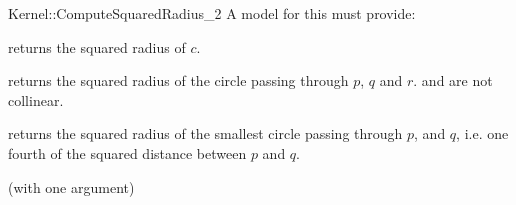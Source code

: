 \begin{ccRefFunctionObjectConcept}{Kernel::ComputeSquaredRadius_2}
A model for this must provide:


       {returns the squared radius of $c$. }

       {returns the squared radius of the circle passing through $p$, $q$
       and $r$. \ccPrecond {} and  are not collinear.}

{returns the squared radius of the smallest circle passing through $p$,
and $q$, i.e. one fourth of the squared distance between $p$ and $q$.}

\ccRefines
{} (with one argument)

\ccSeeAlso
{} \\
  \\

\end{ccRefFunctionObjectConcept}
